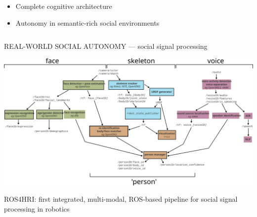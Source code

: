 \documentclass[xcolor=table]{beamer}
\begin{document}
{\begin{frame}
\begin{columns}
\begin{column}{0.3\linewidth}
{\begin{tikzpicture}
                        \end{tikzpicture}
                        }

                    {\scriptsize
                    \begin{itemize}
                        \item Complete cognitive architecture
                        \item Autonomy in semantic-rich social environments
                    \end{itemize}
                    }
                    \end{column}
                \end{columns}

            \end{frame}
            }

{

\begin{frame}{REAL-WORLD SOCIAL AUTONOMY --- social signal processing}
    \begin{center}
        \includegraphics[width=\columnwidth]{architectures/ros4hri-pipeline}
    \end{center}
    ROS4HRI: first integrated, multi-modal, ROS-based pipeline for social signal
    processing in robotics
\end{frame}
}



\end{document}

